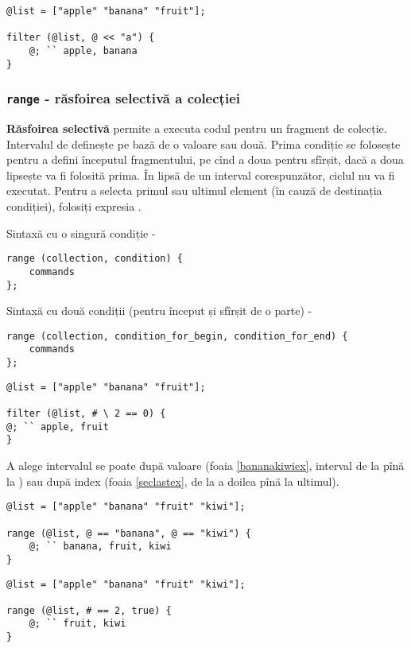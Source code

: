 \begin{lstlisting}[caption=Filtrare pe bază de valoare, label=filterdataex]
@list = ["apple" "banana" "fruit"];

filter (@list, @ << "a") {
	@; `` apple, banana
}
\end{lstlisting}

\subsubsection{\lstinline`range` - răsfoirea selectivă a colecției}

{\bf Răsfoirea selectivă} permite a executa codul pentru un fragment de colecție. Intervalul de definește pe bază de o valoare sau două. Prima condiție se folosește pentru a defini începutul fragmentului, pe cînd a doua pentru sfîrșit, dacă a doua lipsește va fi folosită prima. În lipsă de un interval corespunzător, ciclul nu va fi executat. Pentru a selecta primul sau ultimul element (în cauză de destinația condiției), folosiți expresia \true{}.

Sintaxă cu o singură condiție -
\begin{lstlisting}[numbers=none]
range (collection, condition) {
	commands
};
\end{lstlisting}

Sintaxă cu două condiții (pentru început și sfîrșit de o parte) -
\begin{lstlisting}[numbers=none]
range (collection, condition_for_begin, condition_for_end) {
	commands
};
\end{lstlisting}

\begin{lstlisting}[caption=Filtare după index, label=filterindexex]
@list = ["apple" "banana" "fruit"];

filter (@list, # \ 2 == 0) {
@; `` apple, fruit
}
\end{lstlisting}

A alege intervalul se poate după valoare (foaia \ref{bananakiwiex}, interval de la  pînă la ) sau după index (foaia \ref{seclastex}, de la a doilea pînă la ultimul).

\begin{lstlisting}[caption=Interval: de la banana pîna la kiwi, label=bananakiwiex]
@list = ["apple" "banana" "fruit" "kiwi"];

range (@list, @ == "banana", @ == "kiwi") {
	@; `` banana, fruit, kiwi
}
\end{lstlisting}

\begin{lstlisting}[caption=Intervla: de la al doilea pînă la ultimul, label=seclastex]
@list = ["apple" "banana" "fruit" "kiwi"];

range (@list, # == 2, true) {
	@; `` fruit, kiwi
}
\end{lstlisting}

